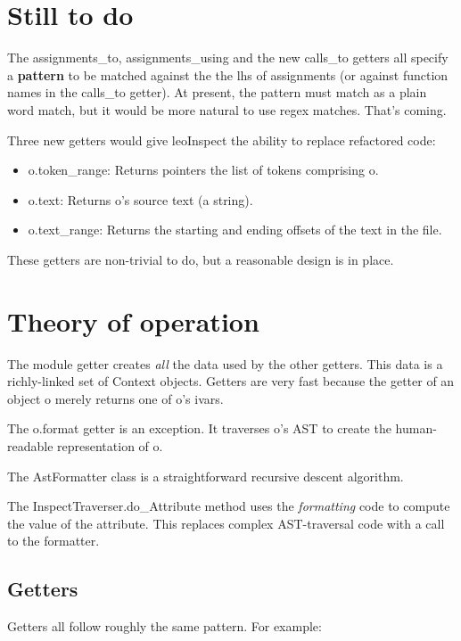 \documentclass[a4paper,10pt,english]{sphinxmanual}
\begin{document}
\section{Still to do}
\label{leoInspect:still-to-do}
The assignments\_to, assignments\_using and the new calls\_to getters all
specify a \textbf{pattern} to be matched against the the lhs of assignments
(or against function names in the calls\_to getter).  At present, the
pattern must match as a plain word match, but it would be more natural
to use regex matches.  That's coming.

Three new getters would give leoInspect the ability to replace
refactored code:
\begin{itemize}
\item {} 
o.token\_range: Returns pointers the list of tokens comprising o.

\item {} 
o.text: Returns o's source text (a string).

\item {} 
o.text\_range: Returns the starting and ending offsets of the text in the file.

\end{itemize}

These getters are non-trivial to do, but a reasonable design is in place.


\section{Theory of operation}
\label{leoInspect:theory-of-operation}
The module getter creates \emph{all} the data used by the other getters.
This data is a richly-linked set of Context objects. Getters are very
fast because the getter of an object o merely returns one of o's
ivars.

The o.format getter is an exception. It traverses o's AST to create
the human-readable representation of o.

The AstFormatter class is a straightforward recursive descent algorithm.

The InspectTraverser.do\_Attribute method uses the \emph{formatting} code to
compute the value of the attribute. This replaces complex
AST-traversal code with a call to the formatter.


\subsection{Getters}
\label{leoInspect:getters}
Getters all follow roughly the same pattern.  For example:
\end{document}
